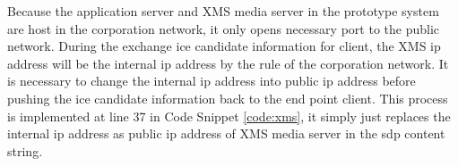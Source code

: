 \par Because the application server and XMS media server in the prototype system are host in the corporation network, it only opens necessary port to the public network. During the exchange \gls{ice} candidate information for client, the XMS \gls{ip} address will be the internal \gls{ip} address by the rule of the corporation network. It is necessary to change the internal \gls{ip} address into public \gls{ip} address before pushing the \gls{ice} candidate information back to the end point client. This process is implemented at line 37 in Code Snippet \ref{code:xms}, it simply just replaces the internal \gls{ip} address as public \gls{ip} address of XMS media server in the \gls{sdp} content string.

